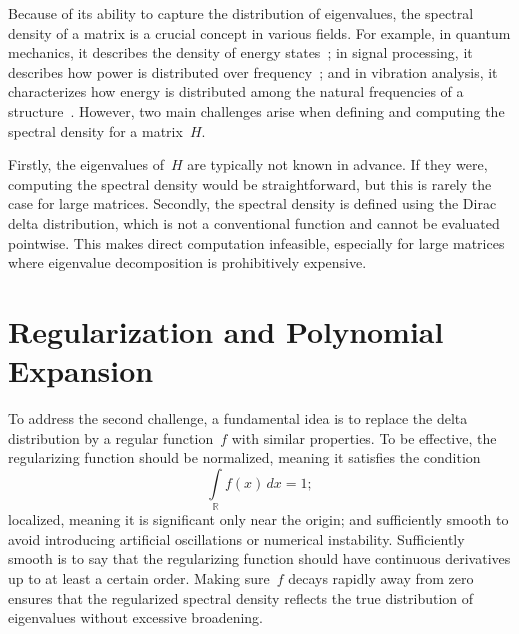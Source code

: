Because of its ability to capture the distribution of eigenvalues, the spectral density of a matrix is a crucial concept in various fields. For example, in quantum mechanics, it describes the density of energy states~\cite{reichl,sakurainapolitano}; in signal processing, it describes how power is distributed over frequency~\cite{oppenheimschafer, mitra}; and in vibration analysis, it characterizes how energy is distributed among the natural frequencies of a structure~\cite{nortonkarczub}. However, two main challenges arise when defining and computing the spectral density for a matrix~$H$.

Firstly, the eigenvalues of~$H$ are typically not known in advance. If they were, computing the spectral density would be straightforward, but this is rarely the case for large matrices. Secondly, the spectral density is defined using the Dirac delta distribution, which is not a conventional function and cannot be evaluated pointwise. This makes direct computation infeasible, especially for large matrices where eigenvalue decomposition is prohibitively expensive.

\section{Regularization and Polynomial Expansion}
To address the second challenge, a fundamental idea is to replace the delta distribution by a regular function~$f$ with similar properties. To be effective, the regularizing function should be normalized, meaning it satisfies the condition
\[
    \int\limits_{\mathbb{R}} f(x)\, dx = 1;
\]
localized, meaning it is significant only near the origin; and sufficiently smooth to avoid introducing artificial oscillations or numerical instability. Sufficiently smooth is to say that the regularizing function should have continuous derivatives up to at least a certain order. Making sure~$f$ decays rapidly away from zero ensures that the regularized spectral density reflects the true distribution of eigenvalues without excessive broadening.

